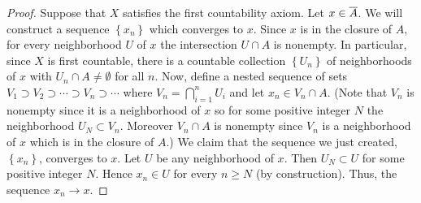 \begin{proof}
Suppose that $X$ satisfies the first countability axiom. Let
$x\in\overline{A}$. We will construct a sequence $\left\{x_n\right\}$
which converges to $x$. Since $x$ is in the closure of $A$, for
every neighborhood $U$ of $x$ the intersection $U\cap A$ is
nonempty. In particular, since $X$ is first countable, there is a
countable collection $\left\{U_n\right\}$ of neighborhoods of $x$
with $U_n\cap A\neq\emptyset$ for all $n$. Now, define a nested
sequence of sets $V_1\supset V_2\supset\cdots\supset
V_n\supset\cdots$ where $V_n=\bigcap_{i=1}^n U_i$ and let $x_n\in
V_n\cap A$. (Note that $V_n$ is nonempty since it is a
neighborhood of $x$ so for some positive integer $N$ the
neighborhood $U_N\subset V_n$. Moreover $V_n\cap A$ is nonempty
since $V_n$ is a neighborhood of $x$ which is in the closure of
$A$.) We claim that the sequence we just created,
$\left\{x_n\right\}$, converges to $x$. Let $U$ be any neighborhood of
$x$. Then $U_N\subset U$ for some positive integer $N$. Hence
$x_n\in U$ for every $n\geq N$ (by construction). Thus, the
sequence $x_n\to
x$.
\end{proof}

